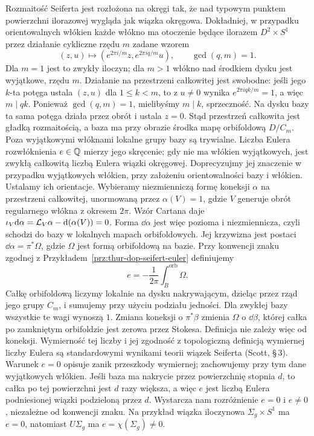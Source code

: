 Rozmaitość Seiferta jest rozłożona na okręgi tak, że nad typowym
punktem powierzchni ilorazowej wygląda jak wiązka okręgowa.
Dokładniej, w przypadku orientowalnych włókien każde włókno ma
otoczenie będące ilorazem $D^2\times S^1$ przez działanie
cykliczne rzędu $m$ zadane wzorem
\[
 (z,u)\longmapsto
 (e^{2\pi i/m}z,e^{2\pi iq/m}u),\qquad \gcd(q,m)=1.
\]
Dla $m=1$ jest to zwykły iloczyn; dla $m>1$ włókno nad środkiem
dysku jest wyjątkowe, rzędu $m$. Działanie na przestrzeni
całkowitej jest swobodne: jeśli jego $k$-ta potęga ustala
$(z,u)$ dla $1\leq k<m$, to z $u\ne0$ wynika
$e^{2\pi iqk/m}=1$, a więc $m\mid qk$. Ponieważ
$\gcd(q,m)=1$, mielibyśmy $m\mid k$, sprzeczność.
Na dysku bazy ta sama potęga działa przez obrót i ustala
$z=0$. Stąd przestrzeń całkowita jest gładką rozmaitością,
a baza ma przy obrazie środka mapę orbifoldową $D/C_m$.
Poza wyjątkowymi włóknami lokalne grupy bazy są trywialne.
Liczba Eulera rozwłóknienia $e\in\mathbb{Q}$ mierzy jego skręcenie;
gdy nie ma włókien wyjątkowych, jest zwykłą całkowitą
liczbą Eulera wiązki okręgowej. Doprecyzujmy jej znaczenie
w przypadku wyjątkowych włókien, przy założeniu orientowalności
bazy i włókien. Ustalamy ich orientacje.
Wybieramy niezmienniczą formę koneksji $\alpha$
na przestrzeni całkowitej, unormowaną przez $\alpha(V)=1$,
gdzie $V$ generuje obrót regularnego włókna z okresem $2\pi$.
Wzór Cartana daje $\iota_V\mathrm d\alpha
=\mathcal L_V\alpha-\mathrm d(\alpha(V))=0$.
Forma $\dd\alpha$ jest więc pozioma i niezmiennicza,
czyli schodzi do bazy w lokalnych mapach orbifoldowych.
Jej krzywizna jest postaci $\dd\alpha=\pi^*\Omega$,
gdzie $\Omega$ jest formą orbifoldową na bazie. Przy konwencji
znaku zgodnej z Przykładem~\ref{prz:thur-dop-seifert-euler}
definiujemy
\[
 e=-\frac1{2\pi}\int_B^{\mathrm{orb}}\Omega.
\]
Całkę orbifoldową liczymy lokalnie na dysku nakrywającym,
dzieląc przez rząd jego grupy $C_m$, i sumujemy przy użyciu
podziału jedności. Dla zwykłej bazy wszystkie te wagi wynoszą $1$.
Zmiana koneksji o $\pi^*\beta$ zmienia $\Omega$ o $\dd\beta$,
której całka po zamkniętym orbifoldzie jest zerowa przez Stokesa.
Definicja nie zależy więc od koneksji. Wymierność tej liczby
i jej zgodność z topologiczną definicją wymiernej liczby Eulera
są standardowymi wynikami teorii wiązek Seiferta (Scott, \S\,3).
Warunek $e=0$ opisuje zanik przeszkody wymiernej;
zachowujemy przy tym dane wyjątkowych włókien.
Jeśli baza ma nakrycie przez powierzchnię stopnia $d$,
to całka po tej powierzchni jest $d$ razy większa, a więc
$e$ jest liczbą Eulera podniesionej wiązki podzieloną przez $d$.
Wystarcza nam rozróżnienie
$e=0$ i $e\ne0$, niezależne od konwencji znaku.
Na przykład wiązka iloczynowa $\Sigma_g\times S^1$ ma $e=0$,
natomiast $U\Sigma_g$ ma $e=\chi(\Sigma_g)\ne0$.

